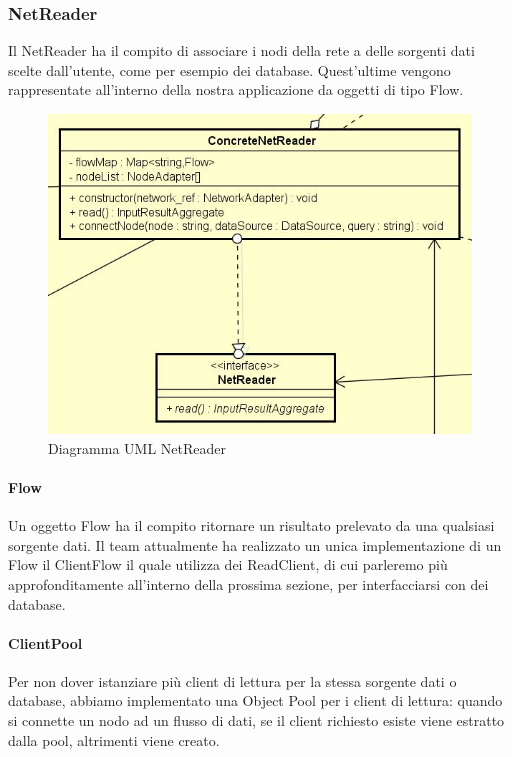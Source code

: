 \subsubsection{NetReader}
Il NetReader ha il compito di associare i nodi della rete a delle sorgenti dati scelte dall'utente, come per esempio dei database. Quest'ultime vengono rappresentate all'interno della nostra applicazione da oggetti di tipo Flow.
\begin{figure} [H]
	\centering
		\includegraphics[scale=0.8]{Img/NetReader}
	\caption{Diagramma UML NetReader}\label{}
\end{figure}
\paragraph{Flow}\Spazio
Un oggetto Flow ha il compito ritornare un risultato prelevato da una qualsiasi sorgente dati.
Il team attualmente ha realizzato un unica implementazione di un Flow il ClientFlow il quale utilizza dei ReadClient, di cui parleremo più approfonditamente all'interno della prossima sezione, per interfacciarsi con dei database.
\paragraph{ClientPool}\Spazio
Per non dover istanziare più client di lettura per la stessa sorgente dati o database, abbiamo implementato una Object Pool per i client di lettura: quando si connette un nodo ad un flusso di dati, se il client richiesto esiste viene estratto dalla pool, altrimenti viene creato.
